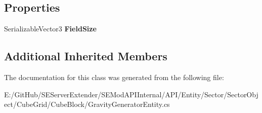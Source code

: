\subsection*{Properties}
\begin{DoxyCompactItemize}
\item 
\hypertarget{class_s_e_mod_a_p_i_internal_1_1_a_p_i_1_1_entity_1_1_sector_1_1_sector_object_1_1_cube_grid_1_152f45445d79844991feac643e7a7ab7c_ab8f37d0cc1e35cfaebc260b372f632ee}{}Serializable\+Vector3 {\bfseries Field\+Size}\label{class_s_e_mod_a_p_i_internal_1_1_a_p_i_1_1_entity_1_1_sector_1_1_sector_object_1_1_cube_grid_1_152f45445d79844991feac643e7a7ab7c_ab8f37d0cc1e35cfaebc260b372f632ee}

\end{DoxyCompactItemize}
\subsection*{Additional Inherited Members}


The documentation for this class was generated from the following file\+:\begin{DoxyCompactItemize}
\item 
E\+:/\+Git\+Hub/\+S\+E\+Server\+Extender/\+S\+E\+Mod\+A\+P\+I\+Internal/\+A\+P\+I/\+Entity/\+Sector/\+Sector\+Object/\+Cube\+Grid/\+Cube\+Block/Gravity\+Generator\+Entity.\+cs\end{DoxyCompactItemize}
